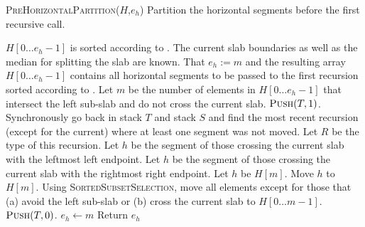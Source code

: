 \begin{algorithm}
  \caption{\textsc{PreHorizontalPartition}(${H}$,$e_h$)
  Partition the horizontal segments before the first recursive call.} 
   \label{algPreHP}
  \begin{algorithmic}[1]
    \REQUIRE ${H}[0\ldots e_h-1]$ is sorted according to
    \LY. The current slab boundaries as well as the median for
    splitting the slab are known.
    \ENSURE That $e_h := m$ and the resulting array 
    ${H}[0\ldots e_h-1]$ contains all horizontal segments to be 
    passed to the first recursion sorted according to \LY.
    \STATE Let $m$ be the number of elements in ${H}[0\ldots
    e_h-1]$ that intersect the left sub-slab and do not cross the
    current slab.
      \STATE $\textsc{Push}(T,1)$. 
      \STATE Synchronously go back in stack $T$ and stack $S$ and find
      the most recent recursion (except for the current) where at
      least one segment was not moved. Let $R$ be the type of this
      recursion. 
        \STATE Let $h$ be the segment of those crossing the current
        slab with the leftmost left endpoint. 
      \ELSE
        \STATE Let $h$ be the segment of those crossing the current
        slab with the rightmost right endpoint. 
      \ENDIF
        \STATE Let $h$ be ${H}[m]$. 
      \ENDIF
      \STATE Move $h$ to ${H}[m]$. \setcounter{StopElement}{\value{ALC@line}}
      \STATE Using \textsc{SortedSubsetSelection}, move all elements
      except for those that (a) avoid the left sub-slab or (b)
      cross the current slab to ${H}[0\ldots m-1]$. 
    \ELSE
      \STATE $\textsc{Push}(T,0)$.
    \ENDIF
    \STATE $e_h \leftarrow m$
    \STATE Return $e_h$
 \end{algorithmic}
\end{algorithm}

